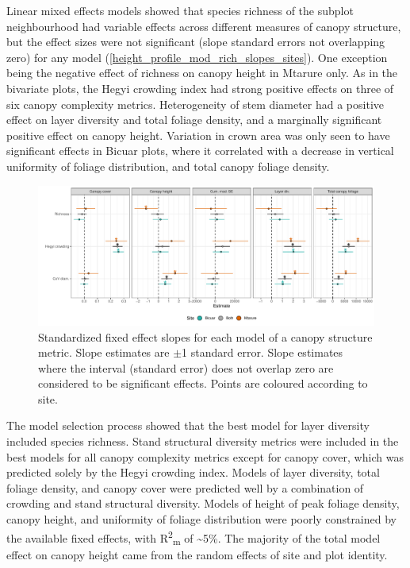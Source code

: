 \documentclass[11pt,a4paper]{article}
\begin{document}
Linear mixed effects models showed that species richness of the subplot neighbourhood had variable effects across different measures of canopy structure, but the effect sizes were not significant (slope standard errors not overlapping zero) for any model (\autoref{height_profile_mod_rich_slopes_sites}). One exception being the negative effect of richness on canopy height in Mtarure only. As in the bivariate plots, the Hegyi crowding index had strong positive effects on three of six canopy complexity metrics. Heterogeneity of stem diameter had a positive effect on layer diversity and total foliage density, and a marginally significant positive effect on canopy height. Variation in crown area was only seen to have significant effects in Bicuar plots, where it correlated with a decrease in vertical uniformity of foliage distribution, and total canopy foliage density.

\begin{figure}[H]
	\includegraphics[width=\textwidth]{height_profile_mod_rich_slopes_sites}
	\caption{Standardized fixed effect slopes for each model of a canopy structure metric. Slope estimates are $\pm$1 standard error. Slope estimates where the interval (standard error) does not overlap zero are considered to be significant effects. Points are coloured according to site.}
	\label{height_profile_mod_rich_slopes_sites}
\end{figure}

The model selection process showed that the best model for layer diversity included species richness. Stand structural diversity metrics were included in the best models for all canopy complexity metrics except for canopy cover, which was predicted solely by the Hegyi crowding index. Models of layer diversity, total foliage density, and canopy cover were predicted well by a combination of crowding and stand structural diversity. Models of height of peak foliage density, canopy height, and uniformity of foliage distribution were poorly constrained by the available fixed effects, with R\textsuperscript{2}\textsubscript{m} of \textasciitilde{}5\%. The majority of the total model effect on canopy height came from the random effects of site and plot identity.
\end{document}
